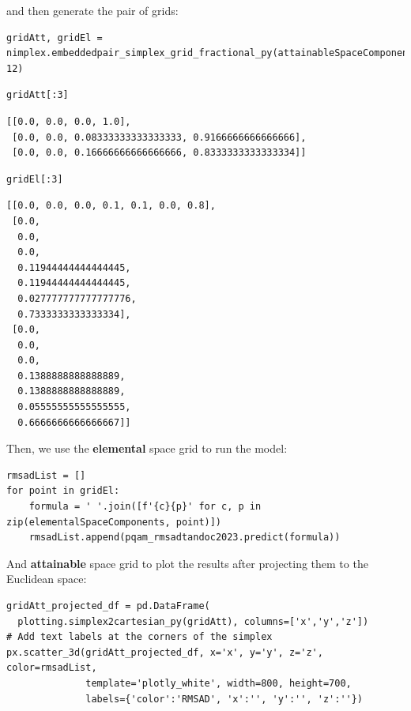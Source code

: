 and then generate the pair of grids:

\begin{verbatim}
gridAtt, gridEl = nimplex.embeddedpair_simplex_grid_fractional_py(attainableSpaceComponentPositions, 12)
\end{verbatim}

\begin{verbatim}
gridAtt[:3]
\end{verbatim}

\begin{verbatim}
[[0.0, 0.0, 0.0, 1.0],
 [0.0, 0.0, 0.08333333333333333, 0.9166666666666666],
 [0.0, 0.0, 0.16666666666666666, 0.8333333333333334]]
\end{verbatim}

\begin{verbatim}
gridEl[:3]
\end{verbatim}

\begin{verbatim}
[[0.0, 0.0, 0.0, 0.1, 0.1, 0.0, 0.8],
 [0.0,
  0.0,
  0.0,
  0.11944444444444445,
  0.11944444444444445,
  0.027777777777777776,
  0.7333333333333334],
 [0.0,
  0.0,
  0.0,
  0.1388888888888889,
  0.1388888888888889,
  0.05555555555555555,
  0.6666666666666667]]
\end{verbatim}

Then, we use the \textbf{elemental} space grid to run the model:

\begin{verbatim}
rmsadList = []
for point in gridEl:
    formula = ' '.join([f'{c}{p}' for c, p in zip(elementalSpaceComponents, point)])
    rmsadList.append(pqam_rmsadtandoc2023.predict(formula))
\end{verbatim}

And \textbf{attainable} space grid to plot the results after projecting
them to the Euclidean space:

\begin{verbatim}
gridAtt_projected_df = pd.DataFrame(
  plotting.simplex2cartesian_py(gridAtt), columns=['x','y','z'])
# Add text labels at the corners of the simplex
px.scatter_3d(gridAtt_projected_df, x='x', y='y', z='z', color=rmsadList,
              template='plotly_white', width=800, height=700, 
              labels={'color':'RMSAD', 'x':'', 'y':'', 'z':''})
\end{verbatim}

